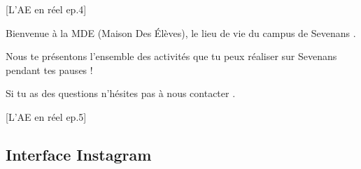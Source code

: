 [L'\gls{AE} en réel ep.4]

Bienvenue à la MDE (Maison Des Élèves), le lieu de vie du campus de Sevenans .

Nous te présentons l'ensemble des activités que tu peux réaliser sur Sevenans pendant tes pauses  !

Si tu as des questions n'hésites pas à nous contacter .

[L'\gls{AE} en réel ep.5]


\newpage

\subsection*{Interface Instagram}\label{subsec:interface-instagram}

